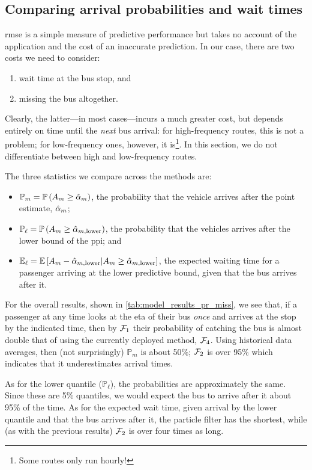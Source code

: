 \subsection{Comparing arrival probabilities and wait times}
\label{sec:prediction_model_comp_probs}

\Gls{rmse} is a simple measure of predictive performance but takes no account of the application and the cost of an inaccurate prediction. In our case, there are two costs we need to consider:
\begin{enumerate}
\item wait time at the bus stop, and
\item missing the bus altogether.
\end{enumerate}
Clearly, the latter---in most cases---incurs a much greater cost, but depends entirely on time until the \emph{next} bus arrival: for high-frequency routes, this is not a problem; for low-frequency ones, however, it is\footnote{Some routes only run hourly!}. In this section, we do not differentiate between high and low-frequency routes.


The three statistics we compare across the methods are:
\begin{itemize}
\item $\mathbb{P}_m = \mathbb{P}\left(A_m \geq \hat{\alpha}_m\right)$, the probability that the vehicle arrives after the point estimate, $\hat{\alpha}_m$;
\item $\mathbb{P}_\ell = \mathbb{P}\left(A_m \geq \hat\alpha_{m,\text{lower}}\right)$, the probability that the vehicles arrives after the lower bound of the \gls{ppi}; and
\item $\mathbb{E}_\ell = \mathbb{E}\left[A_m - \hat\alpha_{m,\text{lower}} | A_m \geq \hat\alpha_{m,\text{lower}}\right]$, the expected waiting time for a passenger arriving at the lower predictive bound, given that the bus arrives after it.
\end{itemize}


For the overall results, shown in \cref{tab:model_results_pr_miss}, we see that, if a passenger at any time looks at the \gls{eta} of their bus \emph{once} and arrives at the stop by the indicated time, then by $\mathcal{F}_1$ their probability of catching the bus is almost double that of using the currently deployed method, $\mathcal{F}_4$. Using historical data averages, then (not surprisingly) $\mathbb{P}_m$ is about 50\%; $\mathcal{F}_2$ is over 95\% which indicates that it underestimates arrival times.


As for the lower quantile ($\mathbb{P}_\ell$), the probabilities are approximately the same. Since these are 5\% quantiles, we would expect the bus to arrive after it about 95\% of the time. As for the expected wait time, given arrival by the lower quantile and that the bus arrives after it, the particle filter has the shortest, while (as with the previous results) $\mathcal{F}_2$ is over four times as long.


